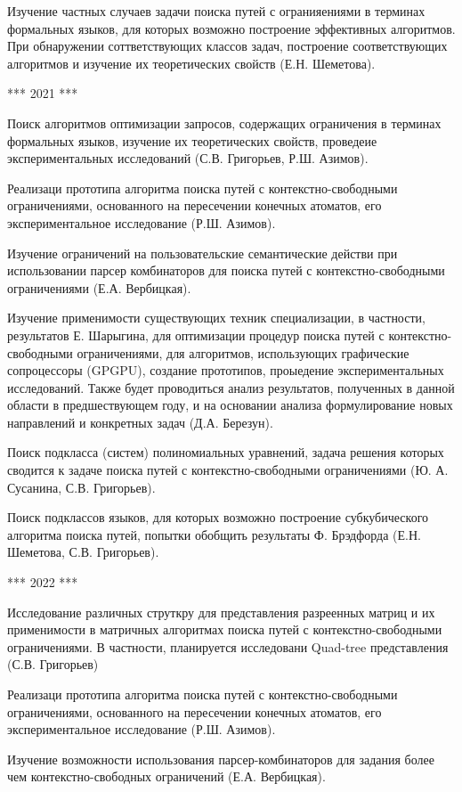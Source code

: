 \documentclass[12pt]{article}  %
\theoremstyle{remark}
\begin{document}
Изучение частных случаев задачи поиска путей с огранияениями в терминах формальных языков, для которых возможно построение эффективных алгоритмов. При обнаружении соттветствующих классов задач, построение соответствующих алгоритмов и изучение их теоретических свойств (Е.Н. Шеметова).


*** 2021 ***

Поиск алгоритмов оптимизации запросов, содержащих ограничения в терминах формальных языков, изучение их теоретических свойств, проведеие экспериментальных исследований (С.В. Григорьев, Р.Ш. Азимов).

Реализаци прототипа алгоритма поиска путей с контекстно-свободными ограничениями, основанного на пересечении конечных атоматов, его экспериментальное исследование (Р.Ш. Азимов).

Изучение ограничений на пользовательские семантические действи при использовании парсер комбинаторов для поиска путей с контекстно-свободными ограничениями (Е.А. Вербицкая).

Изучение применимости существующих техник специализации, в частности, результатов Е. Шарыгина, для оптимизации процедур поиска путей с контекстно-свободными ограничениями, для алгоритмов, использующих графические сопроцессоры (GPGPU), создание прототипов, проыедение экспериментальных исследований. Также будет проводиться анализ результатов, полученных в данной области в предшествующем году, и на основании анализа формулирование новых направлений и конкретных задач (Д.А. Березун).

Поиск подкласса (систем) полиномиальных уравнений, задача решения которых сводится к задаче поиска путей с контекстно-свободными ограничениями (Ю. А. Сусанина, С.В. Григорьев).

Поиск подклассов языков, для которых возможно построение субкубического алгоритма поиска путей, попытки обобщить результаты Ф. Брэдфорда (Е.Н. Шеметова, С.В. Григорьев).


*** 2022 ***

Исследование различных струткру для представления разреенных матриц и их применимости в матричных алгоритмах поиска путей с контекстно-свободными ограничениями. В частности, планируется исследовани Quad-tree представления (С.В. Григорьев)

Реализаци прототипа алгоритма поиска путей с контекстно-свободными ограничениями, основанного на пересечении конечных атоматов, его экспериментальное исследование (Р.Ш. Азимов).

Изучение возможности использования парсер-комбинаторов для задания более чем контекстно-свободных ограничений (Е.А. Вербицкая).
\end{document}
